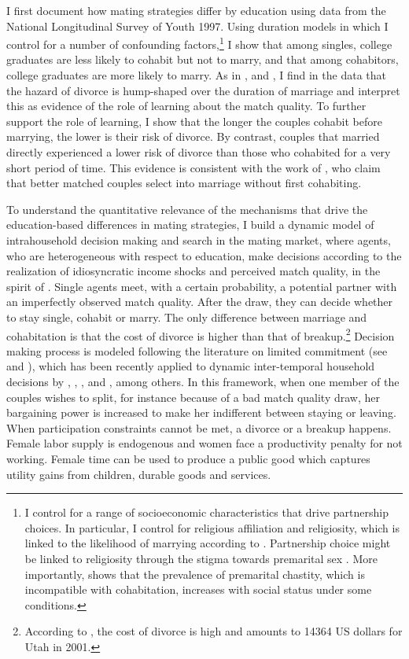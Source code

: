 \documentclass[12pt]{article}
\begin{document}
I first document how mating strategies differ by education using data from the National Longitudinal Survey of Youth 1997. Using duration models in which I control for a number of confounding factors,\footnote{I control for a range of socioeconomic characteristics that drive partnership choices. In particular, I control for religious affiliation and religiosity, which is linked to the likelihood of marrying according to \citet{thornton2008}. Partnership choice might be linked to religiosity through the stigma towards premarital sex \citep{fernandez2014}. More importantly, \cite{mariani2012} shows that the prevalence of premarital chastity, which is incompatible with cohabitation, increases with social status under some conditions.} I show that among singles, college graduates are less likely to cohabit but not to marry, and that among cohabitors, college graduates are more likely to marry. As in \cite{jovanovic1979}, \citet{brien2006} and \cite{marinescu2016}, I find in the data that the hazard of divorce is  hump-shaped over the duration of marriage and interpret this as evidence of the role of learning about the match quality. To further support the role of learning, I show that the longer the couples cohabit before marrying, the lower is their risk of divorce. By contrast, couples that married directly experienced a lower risk of divorce than those who cohabited for a very short period of time. This evidence is consistent with the work of \citet{lillard1995}, who claim that better matched couples select into marriage without first cohabiting.

 To understand the quantitative relevance of the mechanisms that drive the education-based differences in mating strategies, I build a dynamic model of intrahousehold decision making and search in the mating market, where agents, who are heterogeneous with respect to education, make decisions according to the realization of idiosyncratic income shocks and perceived match quality, in the spirit of \citet{jovanovic1979}. Single agents meet, with a certain probability, a potential partner with an imperfectly observed match quality. After the draw, they can decide whether to stay single, cohabit or marry. The only difference between marriage and cohabitation is that the cost of divorce is higher than that of breakup.\footnote{According to \citet{schramm2006}, the cost of divorce is high and amounts to 14364 US dollars for Utah in 2001.} Decision making process is modeled following the literature on limited commitment (see \cite{pavoni2018} and \cite{marcet2019}), which has been recently applied to dynamic inter-temporal household decisions by \cite{rigas2015}, \cite{voena2015}, \cite{low2018}, \cite{mazzocco2007} and \cite{foerster2019}, among others. In this framework, when one member of the couples wishes to split, for instance because of a bad match quality draw, her bargaining power is increased to make her indifferent between staying or leaving. When participation constraints cannot be met, a divorce or a breakup happens. Female labor supply is endogenous and women face a productivity penalty for not working. Female time can be used to produce a public good which captures utility gains from children, durable goods and services.
 
\end{document}
